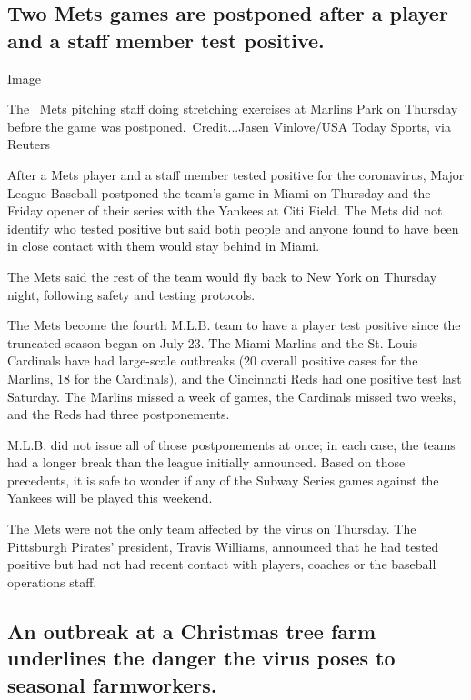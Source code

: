 \hypertarget{two-mets-games-are-postponed-after-a-player-and-a-staff-member-test-positive}{%
\subsection{Two Mets games are postponed after a player and a staff
member test
positive.}\label{two-mets-games-are-postponed-after-a-player-and-a-staff-member-test-positive}}

Image

The~ Mets pitching staff doing stretching exercises at Marlins Park on
Thursday before the game was postponed.~Credit...Jasen Vinlove/USA Today
Sports, via Reuters

After a Mets player and a staff member tested positive for the
coronavirus, Major League Baseball postponed the team's game in Miami on
Thursday and the Friday opener of their series with the Yankees at Citi
Field. The Mets did not identify who tested positive but said both
people and anyone found to have been in close contact with them would
stay behind in Miami.

The Mets said the rest of the team would fly back to New York on
Thursday night, following safety and testing protocols.

The Mets become the fourth M.L.B. team to have a player test positive
since the truncated season began on July 23. The Miami Marlins and the
St. Louis Cardinals have had large-scale outbreaks (20 overall positive
cases for the Marlins, 18 for the Cardinals), and the Cincinnati Reds
had one positive test last Saturday. The Marlins missed a week of games,
the Cardinals missed two weeks, and the Reds had three postponements.

M.L.B. did not issue all of those postponements at once; in each case,
the teams had a longer break than the league initially announced. Based
on those precedents, it is safe to wonder if any of the Subway Series
games against the Yankees will be played this weekend.

The Mets were not the only team affected by the virus on Thursday. The
Pittsburgh Pirates' president, Travis Williams, announced that he had
tested positive but had not had recent contact with players, coaches or
the baseball operations staff.

\hypertarget{an-outbreak-at-a-christmas-tree-farm-underlines-the-danger-the-virus-poses-to-seasonal-farmworkers}{%
\subsection{An outbreak at a Christmas tree farm underlines the danger
the virus poses to seasonal
farmworkers.}\label{an-outbreak-at-a-christmas-tree-farm-underlines-the-danger-the-virus-poses-to-seasonal-farmworkers}}

